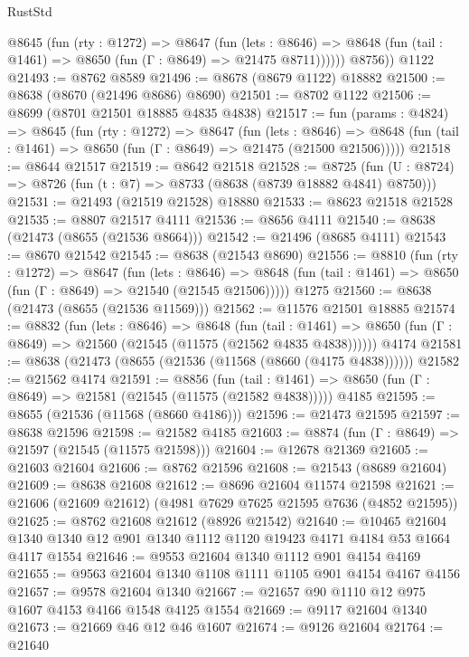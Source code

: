 \begin{lexlean}{RustStd}
\begin{coremodule}
          @8645
            (fun (rty : @1272) =>
            @8647
              (fun (lets : @8646) =>
              @8648 (fun (tail : @1461) => @8650 (fun (Γ : @8649) => @21475 @8711))))))
        @8756))
    @1122
@21493 := @8762 @8589
@21496 := @8678 (@8679 @1122) @18882
@21500 := @8638 (@8670 (@21496 @8686) @8690)
@21501 := @8702 @1122
@21506 := @8699 (@8701 @21501 @18885 @4835 @4838)
@21517 := fun (params : @4824) =>
  @8645
    (fun (rty : @1272) =>
    @8647
      (fun (lets : @8646) =>
      @8648 (fun (tail : @1461) => @8650 (fun (Γ : @8649) => @21475 (@21500 @21506)))))
@21518 := @8644 @21517
@21519 := @8642 @21518
@21528 := @8725
    (fun (U : @8724) => @8726 (fun (t : @7) => @8733 (@8638 (@8739 @18882 @4841) @8750)))
@21531 := @21493 (@21519 @21528) @18880
@21533 := @8623 @21518 @21528
@21535 := @8807 @21517 @4111
@21536 := @8656 @4111
@21540 := @8638 (@21473 (@8655 (@21536 @8664)))
@21542 := @21496 (@8685 @4111)
@21543 := @8670 @21542
@21545 := @8638 (@21543 @8690)
@21556 := @8810
    (fun (rty : @1272) =>
    @8647
      (fun (lets : @8646) =>
      @8648 (fun (tail : @1461) => @8650 (fun (Γ : @8649) => @21540 (@21545 @21506)))))
    @1275
@21560 := @8638 (@21473 (@8655 (@21536 @11569)))
@21562 := @11576 @21501 @18885
@21574 := @8832
    (fun (lets : @8646) =>
    @8648
      (fun (tail : @1461) =>
      @8650 (fun (Γ : @8649) => @21560 (@21545 (@11575 (@21562 @4835 @4838))))))
    @4174
@21581 := @8638 (@21473 (@8655 (@21536 (@11568 (@8660 (@4175 @4838))))))
@21582 := @21562 @4174
@21591 := @8856
    (fun (tail : @1461) => @8650 (fun (Γ : @8649) => @21581 (@21545 (@11575 (@21582 @4838)))))
    @4185
@21595 := @8655 (@21536 (@11568 (@8660 @4186)))
@21596 := @21473 @21595
@21597 := @8638 @21596
@21598 := @21582 @4185
@21603 := @8874 (fun (Γ : @8649) => @21597 (@21545 (@11575 @21598)))
@21604 := @12678 @21369
@21605 := @21603 @21604
@21606 := @8762 @21596
@21608 := @21543 (@8689 @21604)
@21609 := @8638 @21608
@21612 := @8696 @21604 @11574 @21598
@21621 := @21606 (@21609 @21612) (@4981 @7629 @7625 @21595 @7636 (@4852 @21595))
@21625 := @8762 @21608 @21612 (@8926 @21542)
@21640 := @10465
    @21604
    @1340
    @1340
    @12
    @901
    @1340
    @1112
    @1120
    @19423
    @4171
    @4184
    @53
    @1664
    @4117
    @1554
@21646 := @9553 @21604 @1340 @1112 @901 @4154 @4169
@21655 := @9563 @21604 @1340 @1108 @1111 @1105 @901 @4154 @4167 @4156
@21657 := @9578 @21604 @1340
@21667 := @21657 @90 @1110 @12 @975 @1607 @4153 @4166 @1548 @4125 @1554
@21669 := @9117 @21604 @1340
@21673 := @21669 @46 @12 @46 @1607
@21674 := @9126 @21604
@21764 := @21640

\end{coremodule}
\end{lexlean}
